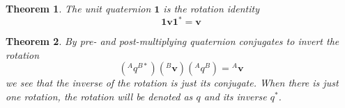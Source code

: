 \documentclass{amsart}
\newtheorem{theorem}{Theorem}[section]
\theoremstyle{definition}
\theoremstyle{remark}
\numberwithin{equation}{section}
\begin{document}
\begin{theorem}
  The \emph{unit quaternion} $\mathbf{1}$ is the rotation identity
  \begin{equation}
   \mathbf{1} \mathbf{v} \mathbf{1}^* = \mathbf{v}  
  \end{equation} 
\end{theorem}

\begin{theorem}
  By pre- and post-multiplying quaternion conjugates to invert the rotation
  \begin{equation}
    \left({^Aq^{B*}}\right)\left({^B\mathbf{v}}\right)\left({^Aq^B}\right)={^A\mathbf{v}}
  \end{equation}
  we see that the inverse of the rotation is just its conjugate. When there is just one rotation, the rotation will be denoted as $q$ and its inverse $q^*$.
\end{theorem}
\end{document}
